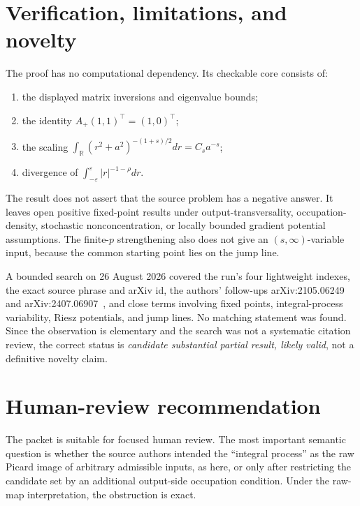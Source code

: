 \documentclass[11pt]{article}
\newcommand{\R}{\mathbb{R}}
\begin{document}
\section{Verification, limitations, and novelty}

The proof has no computational dependency.  Its checkable core consists of:
\begin{enumerate}
\item the displayed matrix inversions and eigenvalue bounds;
\item the identity $A_+(1,1)^\top=(1,0)^\top$;
\item the scaling
$\int_\R(r^2+a^2)^{-(1+s)/2}dr=C_sa^{-s}$;
\item divergence of $\int_{-\varepsilon}^{\varepsilon}|r|^{-1-\rho}dr$.
\end{enumerate}

The result does not assert that the source problem has a negative answer.  It
leaves open positive fixed-point results under output-transversality,
occupation-density, stochastic nonconcentration, or locally bounded gradient
potential assumptions.  The finite-$p$ strengthening also does not give an
$(s,\infty)$-variable input, because the common starting point lies on the
jump line.

A bounded search on 26 August 2026 covered the run's four lightweight indexes,
the exact source phrase and arXiv id, the authors' follow-ups
arXiv:2105.06249~\cite{HTV22} and arXiv:2407.06907~\cite{HTVrough}, and close
terms involving fixed points, integral-process variability, Riesz potentials,
and jump lines.  No matching statement was found.  Since the observation is
elementary and the search was not a systematic citation review, the correct
status is \emph{candidate substantial partial result, likely valid}, not a
definitive novelty claim.

\section{Human-review recommendation}

The packet is suitable for focused human review.  The most important semantic
question is whether the source authors intended the ``integral process'' as
the raw Picard image of arbitrary admissible inputs, as here, or only after
restricting the candidate set by an additional output-side occupation
condition.  Under the raw-map interpretation, the obstruction is exact.
\end{document}
